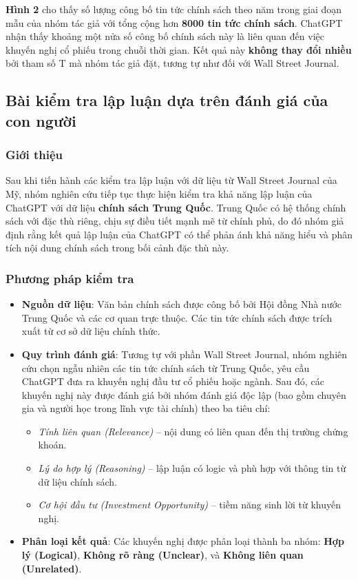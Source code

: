 \documentclass[a4paper,12pt]{article}
\begin{document}
\textbf{Hình 2} cho thấy số lượng công bố tin tức chính sách theo năm trong giai đoạn mẫu của nhóm tác giả với tổng cộng hơn \textbf{8000 tin tức chính sách}. ChatGPT nhận thấy khoảng một nửa số công bố chính sách này là liên quan đến việc khuyến nghị cổ phiếu trong chuỗi thời gian. Kết quả này \textbf{không thay đổi nhiều} bởi tham số T mà nhóm tác giả đặt, tương tự như đối với Wall Street Journal.
\subsection{Bài kiểm tra lập luận dựa trên đánh giá của con người}

\subsubsection{Giới thiệu}
Sau khi tiến hành các kiểm tra lập luận với dữ liệu từ Wall Street Journal của Mỹ, nhóm nghiên cứu tiếp tục thực hiện kiểm tra khả năng lập luận của ChatGPT với dữ liệu \textbf{chính sách Trung Quốc}. Trung Quốc có hệ thống chính sách với đặc thù riêng, chịu sự điều tiết mạnh mẽ từ chính phủ, do đó nhóm giả định rằng kết quả lập luận của ChatGPT có thể phản ánh khả năng hiểu và phân tích nội dung chính sách trong bối cảnh đặc thù này.

\subsubsection{Phương pháp kiểm tra}
\begin{itemize}
    \item \textbf{Nguồn dữ liệu}: Văn bản chính sách được công bố bởi Hội đồng Nhà nước Trung Quốc và các cơ quan trực thuộc. Các tin tức chính sách được trích xuất từ cơ sở dữ liệu chính thức.
    \item \textbf{Quy trình đánh giá}: Tương tự với phần Wall Street Journal, nhóm nghiên cứu chọn ngẫu nhiên các tin tức chính sách từ Trung Quốc, yêu cầu ChatGPT đưa ra khuyến nghị đầu tư cổ phiếu hoặc ngành. Sau đó, các khuyến nghị này được đánh giá bởi nhóm đánh giá độc lập (bao gồm chuyên gia và người học trong lĩnh vực tài chính) theo ba tiêu chí:
    \begin{itemize}
        \item \textit{Tính liên quan (Relevance)} – nội dung có liên quan đến thị trường chứng khoán.
        \item \textit{Lý do hợp lý (Reasoning)} – lập luận có logic và phù hợp với thông tin từ dữ liệu chính sách.
        \item \textit{Cơ hội đầu tư (Investment Opportunity)} – tiềm năng sinh lời từ khuyến nghị.
    \end{itemize}
    \item \textbf{Phân loại kết quả}: Các khuyến nghị được phân loại thành ba nhóm: \textbf{Hợp lý (Logical)}, \textbf{Không rõ ràng (Unclear)}, và \textbf{Không liên quan (Unrelated)}.
\end{itemize}
\end{document}
